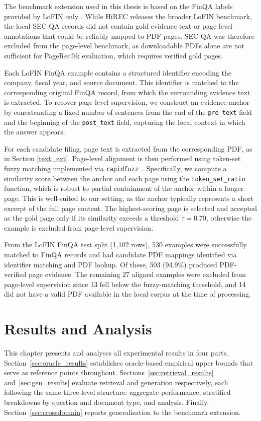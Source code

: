 \documentclass[12pt,twoside,maitrise]{dms}
\newcounter{example}
\theoremstyle{definition}
\numberwithin{equation}{section}
\numberwithin{table}{chapter}
\numberwithin{figure}{chapter}
\begin{document}
The benchmark extension used in this thesis is based on the FinQA labels provided by
LoFIN only \citep{choe2025hirec}. While HiREC releases the broader LoFIN benchmark, the
local SEC-QA records did not contain gold evidence text or page-level annotations that
could be reliably mapped to PDF pages. SEC-QA was therefore excluded from the page-level
benchmark, as downloadable PDFs alone are not sufficient for PageRec@k evaluation, which
requires verified gold pages.

Each LoFIN FinQA example contains a structured identifier encoding the company, fiscal
year, and source document. This identifier is matched to the corresponding original FinQA
record, from which the surrounding evidence text is extracted. To recover page-level
supervision, we construct an evidence anchor by concatenating a fixed number of sentences
from the end of the \texttt{pre\_text} field and the beginning of the \texttt{post\_text}
field, capturing the local context in which the answer appears.

For each candidate filing, page text is extracted from the corresponding PDF, as in Section \ref{text_ext}. Page-level alignment is then performed using token-set fuzzy
matching implemented via \texttt{rapidfuzz}~\citep{bachmann2023rapidfuzz}. Specifically,
we compute a similarity score between the anchor and each page using the
\texttt{token\_set\_ratio} function, which is robust to partial containment of the anchor
within a longer page. This is well-suited to our setting, as the anchor typically represents
a short excerpt of the full page content. The highest-scoring page is selected and accepted
as the gold page only if its similarity exceeds a threshold $\tau = 0.70$, otherwise the
example is excluded from page-level supervision.

From the LoFIN FinQA test split (1,102 rows), 530 examples were successfully matched to
FinQA records and had candidate PDF mappings identified via identifier matching and PDF
lookup. Of these, 503 (94.9\%) produced PDF-verified page evidence. The remaining 27
aligned examples were excluded from page-level supervision since 13 fell below the fuzzy-matching
threshold, and 14 did not have a valid PDF available in the local corpus at the time of
processing.


\chapter{Results and Analysis}
\label{chap:results}

This chapter presents and analyses all experimental results in four parts.
Section~\ref{sec:oracle_results} establishes oracle-based empirical upper bounds that
serve as reference points throughout.  Sections~\ref{sec:retrieval_results}
and~\ref{sec:gen_results} evaluate retrieval and generation respectively, each following
the same three-level structure: aggregate performance, stratified breakdowns by question
and document type, and analysis.  Finally, Section~\ref{sec:crossdomain} reports generalisation to the benchmark extension.  
\end{document}

